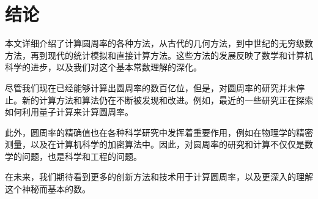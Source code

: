 \documentclass{ctexart}
\begin{document}
\section{结论}

本文详细介绍了计算圆周率的各种方法，从古代的几何方法，到中世纪的无穷级数方法，再到现代的统计模拟和直接计算方法。这些方法的发展反映了数学和计算机科学的进步，以及我们对这个基本常数理解的深化。

尽管我们现在已经能够计算出圆周率的数百亿位，但是，对圆周率的研究并未停止。新的计算方法和算法仍在不断被发现和改进。例如，最近的一些研究正在探索如何利用量子计算来计算圆周率。

此外，圆周率的精确值也在各种科学研究中发挥着重要作用，例如在物理学的精密测量，以及在计算机科学的加密算法中。因此，对圆周率的研究和计算不仅仅是数学的问题，也是科学和工程的问题。

在未来，我们期待看到更多的创新方法和技术用于计算圆周率，以及更深入的理解这个神秘而基本的数。



\end{document}
